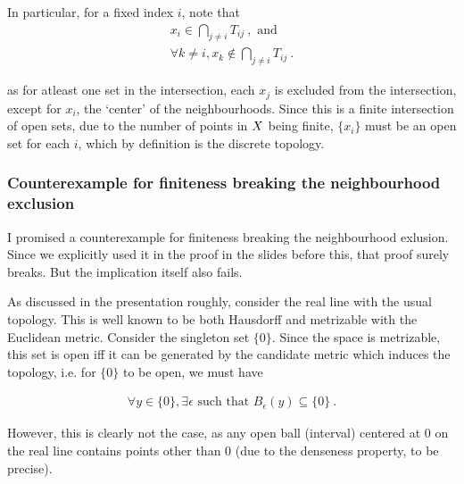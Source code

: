 \begin{frame}

    In particular, for a fixed index \(i\), note that 
    \begin{gather*}
        x_i \in \bigcap_{j\not = i} T_{ij}~, \text{ and}\\ 
        \forall k \not = i, x_k \not \in \bigcap_{j\not = i} T_{ij}~.
    \end{gather*}

    as for atleast one set in the intersection, each \(x_j\) is excluded
    from the intersection, except for \(x_i\), the `center' of the
    neighbourhoods. Since this is a finite intersection of open sets,
    due to the number of points in \(X\) being finite, \(\{x_i\}\)
    must be an open set for each \(i\), which by definition is the
    discrete topology.

\end{frame}

\begin{frame}
    \frametitle{Counterexample for finiteness breaking the neighbourhood exclusion}

    I promised a counterexample for finiteness breaking the neighbourhood
    exlusion. Since we explicitly used it in the proof in the slides before
    this, that proof surely breaks. But the implication itself also fails.

    As discussed in the presentation roughly, consider the real line with the
    usual topology. This is well known to be both Hausdorff and metrizable with
    the Euclidean metric. Consider the singleton set \(\{0\}\). Since the space
    is metrizable, this set is open iff it can be generated by the candidate
    metric which induces the topology, i.e. for \(\{0\}\) to be open, we must have

    \begin{gather*}
        \forall y \in \{0\}, \exists \epsilon \text{ such that } B_\epsilon(y) \subseteq \{0\}~.
    \end{gather*}

    However, this is clearly not the case, as any open ball (interval) centered
    at 0 on the real line contains points other than 0 (due to the denseness
    property, to be precise).

\end{frame}